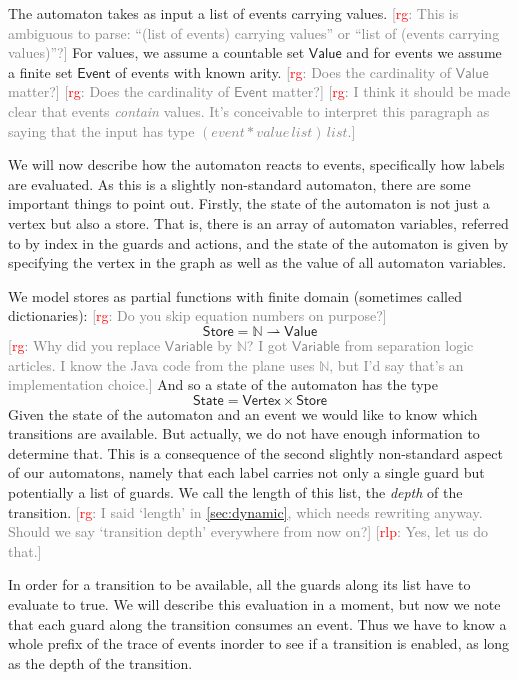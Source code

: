 \documentclass[preprint]{sigplanconf} %
\newcommand{\note}[2]{\textcolor{gray}{[\textcolor{red}{#1}: #2]}}
\newcommand{\rg}[1]{\note{rg}{#1}}
\newcommand{\rlp}[1]{\note{rlp}{#1}}
\newcommand{\N}{\ensuremath{\mathbb{N}}}
\newcommand{\pmap}{\rightharpoonup}
\newcommand{\set}[1]{\ensuremath{\mathsf{#1}}}
\theoremstyle{definition}
\theoremstyle{remark}
\begin{document}
The automaton takes as input a list of events carrying values.
\rg{This is ambiguous to parse: ``(list of events) carrying values'' or ``list of (events carrying values)''?}
For values, we assume a countable set \set{Value} and for events we assume
a finite set \set{Event} of events with known arity.
\rg{Does the cardinality of \set{Value} matter?}
\rg{Does the cardinality of \set{Event} matter?}
\rg{I think it should be made clear that events \emph{contain} values.
It's conceivable to interpret this paragraph as saying that the input has type $(\mathit{event}*\mathit{value}\,\mathit{list})\,\mathit{list}$.}

We will now describe how the automaton reacts to events, specifically
how labels are evaluated. As this is a slightly non-standard
automaton, there are some important things to point out. Firstly, the
state of the automaton is not just a vertex but also a store. 
That is, there is an array of automaton variables, referred to by
index in the guards and actions, and the state of the automaton is
given by specifying the vertex in the graph as well as the value of
all automaton variables.

We model stores as partial functions with finite domain (sometimes called dictionaries):
\rg{Do you skip equation numbers on purpose?}
\[
\set{Store} = \N \pmap \set{Value}
\]
\rg{Why did you replace \set{Variable} by $\N$?
I got \set{Variable} from separation logic articles.
I know the Java code from the plane uses $\N$, but I'd say that's an implementation choice.}
And so a state of the automaton has the type
\[
\set{State} = \set{Vertex}\times\set{Store}
\]
Given the state of the automaton and an event we would like to know
which transitions are available. But actually, we do not have enough
information to determine that. This is a consequence of the second
slightly non-standard aspect of our automatons, namely that each label
carries not only a single guard but potentially a list of guards.
We call the length of this list, the \emph{depth} of the transition.
\rg{I said `length' in \autoref{sec:dynamic}, which needs rewriting anyway.
Should we say `transition depth' everywhere from now on?}
\rlp{Yes, let us do that.}

In order for a transition to be available, all the guards along its
list have to evaluate to true. We will describe this evaluation in a
moment, but now we note that each guard along the transition consumes
an event. Thus we have to know a whole prefix of the trace of events
inorder to see if a transition is enabled, as long as the depth of the
transition.
\end{document}
